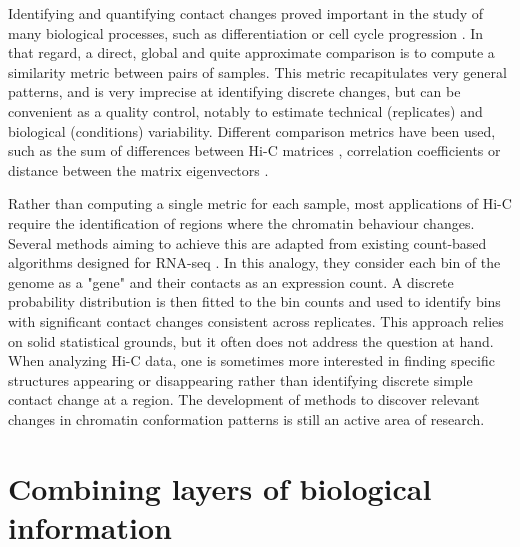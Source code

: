 Identifying and quantifying contact changes proved important in the study of many biological processes, such as differentiation or cell cycle progression \cite{andreySwitchTopologicalDomains2013,lupianezDisruptionsTopologicalChromatin2015,CohesinsCondensinsOrchestrate2017}. In that regard, a direct, global and quite approximate comparison is to compute a similarity metric between pairs of samples. This metric recapitulates very general patterns, and is very imprecise at identifying discrete changes, but can be convenient as a quality control, notably to estimate technical (replicates) and biological (conditions) variability. Different comparison metrics have been used, such as the sum of differences between Hi-C matrices \cite{ursuGenomeDISCOConcordanceScore2018}, correlation coefficients \cite{yangHiCRepAssessingReproducibility} or distance between the matrix eigenvectors \cite{yanHiCspectorMatrixLibrary2017}.

Rather than computing a single metric for each sample, most applications of Hi-C require the identification of regions where the chromatin behaviour changes. Several methods aiming to achieve this are adapted from existing count-based algorithms designed for RNA-seq \citep{lunDiffHicBioconductorPackage2015,stansfieldMultiHiCcompareJointNormalization2019,heinzSimpleCombinationsLineageDetermining2010}. In this analogy, they consider each bin of the genome as a "gene" and their contacts as an expression count. A discrete probability distribution is then fitted to the bin counts and used to identify bins with significant contact changes consistent across replicates. This approach relies on solid statistical grounds, but it often does not address the question at hand. When analyzing Hi-C data, one is sometimes more interested in finding specific structures appearing or disappearing rather than identifying discrete simple contact change at a region. The development of methods to discover relevant changes in chromatin conformation patterns is still an active area of research.

\section{Combining layers of biological information}

